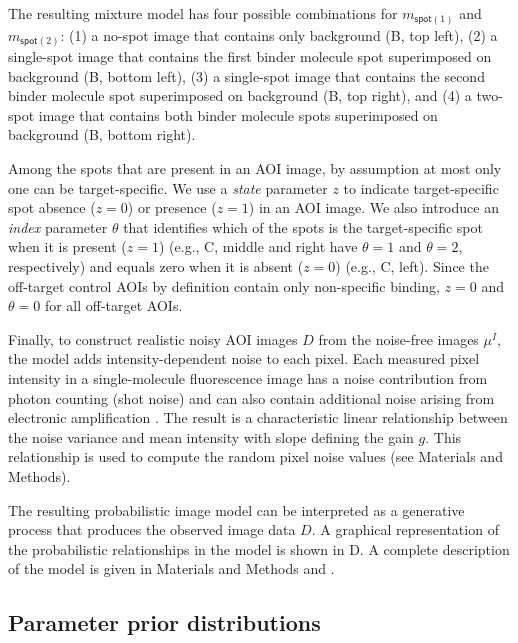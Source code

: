 The resulting mixture model has four possible combinations for $m_{\mathsf{spot}(1)}$ and $m_{\mathsf{spot}(2)}$: (1) a no-spot image that contains only background (B, top left), (2) a single-spot image that contains the first binder molecule spot superimposed on background (B, bottom left), (3) a single-spot image that contains the second binder molecule spot superimposed on background (B, top right), and (4) a two-spot image that contains both binder molecule spots superimposed on background (B, bottom right).

Among the spots that are present in an AOI image, by assumption at most only one can be target-specific. We use a \emph{state} parameter $z$ to indicate target-specific spot absence ($z=0$) or presence ($z=1$) in an AOI image. We also introduce an \emph{index} parameter $\theta$ that identifies which of the spots is the target-specific spot  when it is present ($z = 1$) (e.g., C, middle and right have $\theta = 1$ and $\theta = 2$, respectively) and equals zero when it is absent ($z = 0$) (e.g., C, left). Since the off-target control AOIs by definition contain only non-specific binding, $z = 0$ and $\theta = 0$ for all off-target AOIs. 

Finally, to construct realistic noisy AOI images $D$ from the noise-free images $\mu^I$, the model adds intensity-dependent noise to each pixel.  Each measured pixel intensity in a single-molecule fluorescence image has a noise contribution from photon counting (shot noise) and can also contain additional noise arising from electronic amplification \citep{Van_Vliet1998-jk}. The result is a characteristic linear relationship between the noise variance and mean intensity with slope defining the gain $g$. This relationship is used to compute the random pixel noise values (see Materials and Methods).

The resulting probabilistic image model can be interpreted as a generative process that produces the observed image data $D$. A graphical representation of the probabilistic relationships in the model is shown in D. A complete description of the model is given in Materials and Methods and .  
 


\subsection{Parameter prior distributions}

